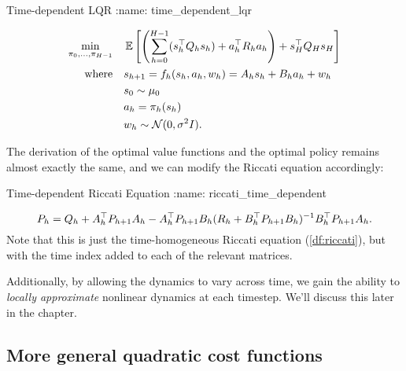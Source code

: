 \documentclass[\main/main]{subfiles}
\begin{document}
\begin{definition}{Time-dependent LQR}
:name: time_dependent_lqr

    \begin{align*}
        \min_{\pi_{0}, \dots, \pi_{H-1}} \quad & \operatorname*{\mathbb{E}} \left[ \left( \sum_{h=0}^{H-1} (s_h^\top Q_h s_h) + a_h^\top R_h a_h \right) + s_H^\top Q_H s_H \right] \\
        \textrm{where} \quad                      & s_{h+1} = f_h(s_h, a_h, w_h) = A_h s_h + B_h a_h + w_h                                                             \\
                                                  & s_0 \sim \mu_0                                                                                                                                   \\
                                                  & a_h = \pi_h (s_h)                                                                                                                       \\
                                                  & w_h \sim \mathcal{N}(0, \sigma^2 I).
    \end{align*}
\end{definition}

The derivation of the optimal value functions and the optimal policy remains almost exactly the same,
and we can modify the Riccati equation accordingly:

\begin{definition}{Time-dependent Riccati Equation}
:name: riccati_time_dependent

    \[
        P_h = Q_h + A_h^\top P_{h+1} A_h - A_h^\top P_{h+1} B_h (R_h + B_h^\top P_{h+1} B_h)^{-1} B_h^\top P_{h+1} A_h.
    \]
    Note that this is just the time-homogeneous Riccati equation (\autoref{df:riccati}),
    but with the
    time index added to each of the relevant matrices.
\end{definition}

Additionally, by allowing the dynamics to vary across time,
we gain the ability to \emph{locally approximate} nonlinear dynamics at each timestep.
We'll discuss this later in the chapter.

\subsection[General quadratic cost]{More general quadratic cost functions}
\end{document}
